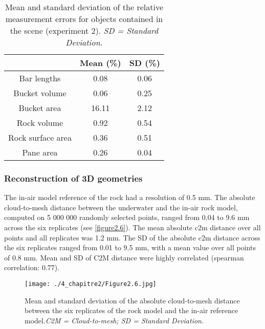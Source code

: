 \begin{table}[htbp]
  \centering
  \normalsize
  \caption[Mean and standard deviation of the relative measurement errors for objects contained in the scene]{Mean and standard deviation of the relative measurement errors for objects contained in the scene (experiment 2). \textit{SD = Standard Deviation.}}
  \label{table2.6}
  
\begin{tabular}{*{3}{c}}
        \toprule
                          & \textbf{Mean (\%)} & \textbf{SD (\%)} \\ \midrule
        Bar lengths       & 0.08               & 0.06             \\
        Bucket volume     & 0.06               & 0.25             \\
        Bucket area       & 16.11              & 2.12             \\
        Rock volume       & 0.92               & 0.54             \\
        Rock surface area & 0.36               & 0.51             \\
        Pane area         & 0.26               & 0.04             \\ \bottomrule
    \end{tabular}
\end{table}

\subsubsection{Reconstruction of 3D geometries}\label{chapitre2_3.2.3}
The in-air model reference of the rock had a resolution of 0.5 mm. The absolute cloud-to-mesh distance between the underwater and the in-air rock model, computed on 5 000 000 randomly selected points, ranged from 0.04 to 9.6 mm across the six replicates (see \autoref{figure2.6}). The mean absolute \acrshort{c2m} distance over all points and all replicates was 1.2 mm. The SD of the absolute \acrshort{c2m} distance across the six replicates ranged from 0.01 to 9.5 mm, with a mean value over all points of 0.8 mm. Mean and SD of C2M distance were highly correlated (spearman correlation: 0.77).

\begin{figure}[htbp]
	\texttt{[image: ./4\_chapitre2/Figure2.6.jpg]}
	\caption[Mean and standard deviation of the absolute cloud-to-mesh distance between the six replicates of the rock model and the in-air reference model.]{Mean and standard deviation of the absolute cloud-to-mesh distance between the six replicates of the rock model and the in-air reference model.\textit{C2M = Cloud-to-mesh; SD = Standard Deviation.}}
	\label{figure2.6}
\end{figure}


